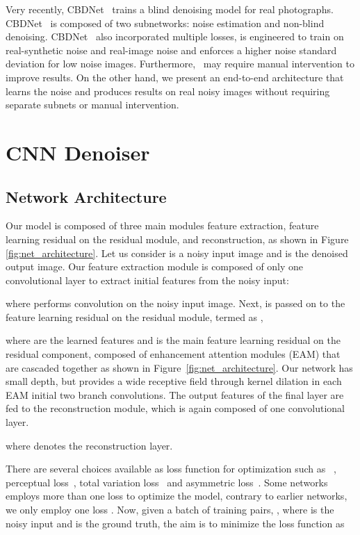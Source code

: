 \documentclass[10pt,twocolumn,letterpaper]{article}
\begin{document}
Very recently, CBDNet~\cite{guo2018CBDnet} trains a blind denoising model for real photographs. CBDNet~\cite{guo2018CBDnet} is composed of two subnetworks: noise estimation and non-blind denoising.  CBDNet~\cite{guo2018CBDnet} also incorporated multiple losses, is engineered to train on real-synthetic noise and real-image noise and enforces a higher noise standard deviation for low noise images. Furthermore,~\cite{guo2018CBDnet,zhang2018ffdnet} may require manual intervention to improve results. On the other hand, we present an end-to-end architecture that learns the noise and produces results on real noisy images without requiring separate subnets or manual intervention.






\section{CNN Denoiser}
\subsection{Network Architecture}
Our model is composed of three main modules \ie feature extraction, feature learning residual on the residual module, and reconstruction, as shown in Figure \ref{fig:net_architecture}.  Let us consider  is a noisy input image and  is the denoised output image.  Our feature extraction module is composed of only one convolutional layer to extract initial features  from the noisy input:


where  performs convolution on the noisy input image. Next,  is passed on to the feature learning residual on the residual module, termed as , 
  
where  are the learned features and  is the main feature learning residual on the residual component, composed of enhancement attention modules (EAM) that are cascaded together as shown in Figure~\ref{fig:net_architecture}. Our network has small depth, but provides a wide receptive field through kernel dilation in each EAM initial two branch convolutions. The output features of the final layer are fed to the reconstruction module, which is again composed of one convolutional layer.


  
where
 denotes the reconstruction layer. 

There are several choices available as loss function for optimization such as  ~\cite{zhang2017DnCNN,zhang2017IRCNN,anwar2017chaining}, perceptual loss~\cite{jiao2017formresnet,guo2018CBDnet}, total variation loss~\cite{jiao2017formresnet} and asymmetric loss~\cite{guo2018CBDnet}. Some networks~\cite{jiao2017formresnet,guo2018CBDnet} employs more than one loss to optimize the model, contrary to  earlier networks, we only employ one loss \ie . Now, given a batch of  training pairs, , where  is the noisy input and  is the ground truth, the aim is to minimize the  loss function as 
\end{document}
